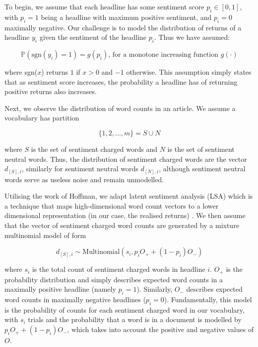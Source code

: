 To begin, we assume that each headline has some sentiment score $p_i \in [0,1]$, with $p_i = 1$ being a headline with maximum positive sentiment, and $p_i = 0$ maximally negative. Our challenge is to model the distribution of returns of a headline $y_i$ given the sentiment of the headline $p_i$. Thus we have assumed:

\begin{equation}
\mathbb{P}(\text{sgn}(y_i) = 1) = g(p_i) \text{, for a monotone increasing function } g(\cdot)
\end{equation}

\noindent
where sgn($x$) returns $1$ if $x > 0$ and $-1$ otherwise. This assumption simply states that as sentiment score increases, the probability a headline has of returning positive returns also increases.

Next, we observe the distribution of word counts in an article. We assume a vocabulary has partition

\begin{equation}
\{1,2,\dots,m\} = S \cup N
\end{equation}

\noindent
where $S$ is the set of sentiment charged words and $N$ is the set of sentiment neutral words. Thus, the distribution of sentiment charged words are the vector $d_{[S],i}$, similarly for sentiment neutral words $d_{[N],i}$, although sentiment neutral words serve as useless noise and remain unmodelled.

Utilising the work of Hoffman, we adapt latent sentiment analysis (LSA) which is a technique that maps high-dimensional word count vectors to a lower dimensional representation (in our case, the realised returns) \parencite{lsa}. We then assume that the vector of sentiment charged word counts are generated by a mixture multinomial model of form

\begin{equation}
d_{[S],i} \sim \text{Multinomial}(s_i, p_iO_+ + (1-p_i)O_-)
\label{multinom}
\end{equation}

\noindent
where $s_i$ is the total count of sentiment charged words in headline $i$. $O_+$ is the probability distribution and simply describes expected word counts in a maximally positive headline (namely $p_i = 1$). Similarly, $O_-$ describes expected word counts in maximally negative headlines ($p_i = 0$). Fundamentally, this model is the probability of counts for each sentiment charged word in our vocabulary, with $s_i$ trials and the probability that a word is in a document is modelled by $p_iO_+ + (1-p_i)O_-$, which takes into account the positive and negative values of $O$.

